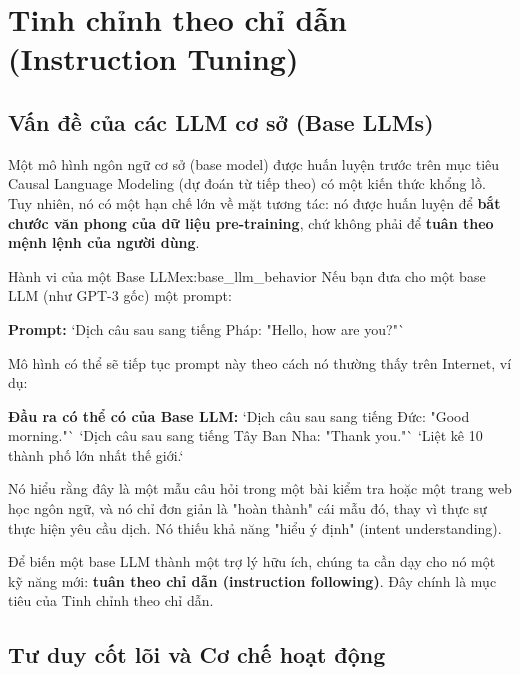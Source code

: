 
\section{Tinh chỉnh theo chỉ dẫn (Instruction Tuning)}
\label{sec:instruction_tuning}

\subsection{Vấn đề của các LLM cơ sở (Base LLMs)}
\label{ssec:base_llm_problem}

Một mô hình ngôn ngữ cơ sở (base model) được huấn luyện trước trên mục tiêu Causal Language Modeling (dự đoán từ tiếp theo) có một kiến thức khổng lồ. Tuy nhiên, nó có một hạn chế lớn về mặt tương tác: nó được huấn luyện để \textbf{bắt chước văn phong của dữ liệu pre-training}, chứ không phải để \textbf{tuân theo mệnh lệnh của người dùng}.

\begin{example}{Hành vi của một Base LLM}{ex:base_llm_behavior}
    Nếu bạn đưa cho một base LLM (như GPT-3 gốc) một prompt:

    \textbf{Prompt:} `Dịch câu sau sang tiếng Pháp: "Hello, how are you?"`

    Mô hình có thể sẽ tiếp tục prompt này theo cách nó thường thấy trên Internet, ví dụ:

    \textbf{Đầu ra có thể có của Base LLM:}
    `Dịch câu sau sang tiếng Đức: "Good morning."`
    `Dịch câu sau sang tiếng Tây Ban Nha: "Thank you."`
    `Liệt kê 10 thành phố lớn nhất thế giới.`

    Nó hiểu rằng đây là một mẫu câu hỏi trong một bài kiểm tra hoặc một trang web học ngôn ngữ, và nó chỉ đơn giản là "hoàn thành" cái mẫu đó, thay vì thực sự thực hiện yêu cầu dịch. Nó thiếu khả năng "hiểu ý định" (intent understanding).
\end{example}

Để biến một base LLM thành một trợ lý hữu ích, chúng ta cần dạy cho nó một kỹ năng mới: \textbf{tuân theo chỉ dẫn (instruction following)}. Đây chính là mục tiêu của Tinh chỉnh theo chỉ dẫn.

\subsection{Tư duy cốt lõi và Cơ chế hoạt động}
\label{ssec:instruction_tuning_mechanism}

